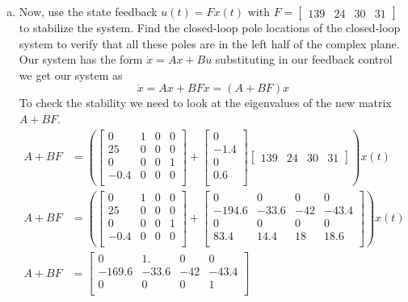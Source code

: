 \documentclass{article}
\begin{document}
\begin{enumerate}[(a)]
\item Now, use the state feedback $u(t) = Fx(t)$ with $F = \begin{bmatrix} 139 & 24 & 30 & 31 \end{bmatrix}$ to stabilize the system.
Find the closed-loop pole locations of the closed-loop system to verify that all these poles are in the left half of the complex plane.
\newline
\newline
Our system has the form $\dot{x} = Ax +Bu$ substituting in our feedback control we get our system as
$$\dot{x} = Ax + BFx = (A+BF)x$$
To check the stability we need to look at the eigenvalues of the new matrix $A+BF$.
\begin{align*}
A + BF &=
\left(
\begin{bmatrix}
0 & 1 & 0 & 0 \\
25 & 0 & 0 & 0 \\
0 & 0 & 0 & 1 \\
-0.4 & 0 & 0 & 0 \\
\end{bmatrix}
+
\begin{bmatrix}
0 \\
-1.4 \\
0 \\
0.6 \\
\end{bmatrix}
\begin{bmatrix} 139 & 24 & 30 & 31 \end{bmatrix}
\right)
x(t) \\
A + BF &=
\left(
\begin{bmatrix}
0 & 1 & 0 & 0 \\
25 & 0 & 0 & 0 \\
0 & 0 & 0 & 1 \\
-0.4 & 0 & 0 & 0 \\
\end{bmatrix}
+
\begin{bmatrix}
0 & 0 & 0 & 0 \\
-194.6 & -33.6 & -42 & -43.4 \\
0 & 0 & 0 & 0 \\
83.4 & 14.4 & 18 & 18.6 \\
\end{bmatrix}
\right)
x(t) \\
A + BF &=
\begin{bmatrix}
0 & 1. & 0 & 0 \\
-169.6 & -33.6 & -42 & -43.4 \\
0 & 0 & 0 & 1 \\

\end{bmatrix}
\end{align*}
\end{enumerate}
\end{document}
